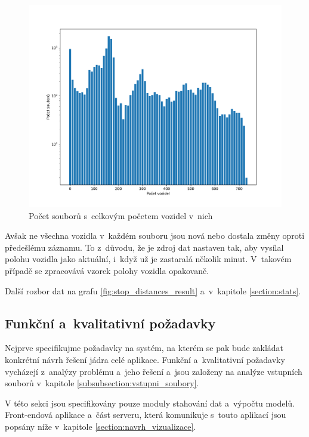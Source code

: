 \begin{figure}
	\centering
  \includegraphics[width=\linewidth]{../img/all_trips}
  \caption{Počet souborů s~celkovým početem vozidel v~nich}
  \label{fig:vehicle_pos_x_all_trips}
\end{figure}

\bigbreak

Avšak ne všechna vozidla v~každém souboru jsou nová nebo dostala změny oproti předešlému záznamu. To z~důvodu, že je zdroj dat nastaven tak, aby vysílal polohu vozidla jako aktuální, i~když už je zastaralá několik minut. V~takovém případě se zpracovává vzorek polohy vozidla opakovaně.

\bigbreak

Další rozbor dat na grafu \ref{fig:stop_distances_result} a~v~kapitole \ref{section:stats}.

\subsection{Funkční a~kvalitativní požadavky}


Nejprve specifikujme požadavky na systém, na kterém se pak bude zakládat
konkrétní návrh řešení jádra celé aplikace. Funkční a~kvalitativní požadavky vycházejí z~analýzy problému a~jeho řešení a~jsou založeny na analýze vstupních souborů v~kapitole \ref{subsubsection:vstupni_soubory}.

\bigbreak

V této sekci jsou specifikovány pouze moduly stahování dat a~výpočtu modelů. Front-endová aplikace a~část serveru, která komunikuje s~touto aplikací jsou popsány níže v~kapitole \ref{section:navrh_vizualizace}.


